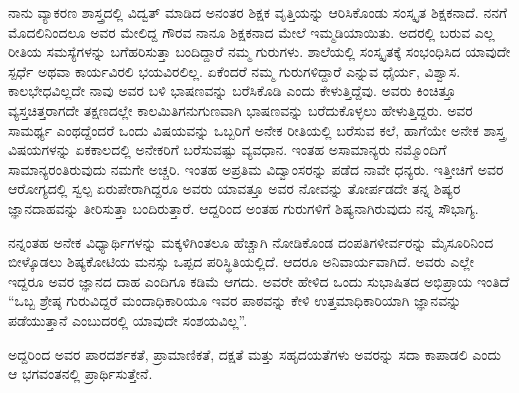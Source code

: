 {ನಾನು ವ್ಯಾಕರಣ ಶಾಸ್ತ್ರದಲ್ಲಿ ವಿದ್ವತ್ ಮಾಡಿದ ಅನಂತರ ಶಿಕ್ಷಕ ವೃತ್ತಿಯನ್ನು ಆರಿಸಿ\-ಕೊಂಡು ಸಂಸ್ಕೃತ ಶಿಕ್ಷಕನಾದೆ. ನನಗೆ ಮೊದಲಿನಿಂದಲೂ ಅವರ ಮೇಲಿದ್ದ ಗೌರವ ನಾನೂ ಶಿಕ್ಷಕನಾದ ಮೇಲೆ ಇಮ್ಮಡಿಯಾಯಿತು. ಅದರಲ್ಲಿ ಬರುವ ಎಲ್ಲ ರೀತಿಯ ಸಮಸ್ಯೆ\-ಗಳನ್ನು ಬಗೆಹರಿಸುತ್ತಾ ಬಂದಿದ್ದಾರೆ ನಮ್ಮ ಗುರುಗಳು. ಶಾಲೆಯಲ್ಲಿ ಸಂಸ್ಕೃತಕ್ಕೆ ಸಂಭಂಧಿಸಿದ ಯಾವುದೇ ಸ್ಪರ್ಧೆ ಅಥವಾ ಕಾರ್ಯವಿರಲಿ ಭಯವಿರಲಿಲ್ಲ. ಏಕೆಂದರೆ ನಮ್ಮ ಗುರುಗಳಿದ್ದಾರೆ ಎನ್ನುವ ಧೈರ್ಯ, ವಿಶ್ವಾಸ. ಕಾಲಭೇಧವಿಲ್ಲದೇ ನಾವು ಅವರ ಬಳಿ ಭಾಷಣವನ್ನು ಬರೆಸಿಕೊಡಿ ಎಂದು ಕೇಳುತ್ತಿದ್ದೆವು. ಅವರು ಕಿಂಚಿತ್ತೂ ವ್ಯಸ್ತಚಿತ್ತ\-ರಾಗದೇ ತಕ್ಷಣದಲ್ಲೇ ಕಾಲಮಿತಿಗನುಗುಣವಾಗಿ ಭಾಷಣವನ್ನು ಬರೆದುಕೊಳ್ಳಲು ಹೇಳುತ್ತಿದ್ದರು.  ಅವರ ಸಾಮರ್ಥ್ಯ ಎಂಥದ್ದೆಂದರೆ ಒಂದು ವಿಷಯವನ್ನು ಒಬ್ಬರಿಗೆ ಅನೇಕ ರೀತಿಯಲ್ಲಿ  ಬರೆಸುವ ಕಲೆ, ಹಾಗೆಯೇ ಅನೇಕ ಶಾಸ್ತ್ರ ವಿಷಯಗಳನ್ನು ಏಕಕಾಲದಲ್ಲಿ ಅನೇಕರಿಗೆ ಬರೆಸುವಷ್ಟು ವ್ಯವಧಾನ. ಇಂತಹ ಅಸಾಮಾನ್ಯರು ನಮ್ಮೊಂದಿಗೆ ಸಾಮಾನ್ಯರಂತಿರು\-ವುದು ನಮಗೇ ಅಚ್ಚರಿ. ಇಂತಹ ಅಪ್ರತಿಮ ವಿದ್ವಾಂಸರನ್ನು ಪಡೆದ ನಾವೇ ಧನ್ಯರು. ಇತ್ತೀಚಿಗೆ ಅವರ ಆರೋಗ್ಯದಲ್ಲಿ ಸ್ವಲ್ಪ ಏರುಪೇರಾಗಿದ್ದರೂ ಅವರು ಯಾವತ್ತೂ ಅವರ ನೋವನ್ನು ತೋರ್ಪಡದೇ ತನ್ನ ಶಿಷ್ಯರ ಜ್ಞಾನದಾಹವನ್ನು ತೀರಿಸುತ್ತಾ ಬಂದಿರುತ್ತಾರೆ. ಆದ್ದರಿಂದ ಅಂತಹ ಗುರುಗಳಿಗೆ ಶಿಷ್ಯನಾಗಿರುವುದು ನನ್ನ ಸೌಭಾಗ್ಯ.
	
ನನ್ನಂತಹ ಅನೇಕ ವಿಧ್ಯಾರ್ಥಿಗಳನ್ನು ಮಕ್ಕಳಿಗಿಂತಲೂ ಹೆಚ್ಚಾಗಿ ನೋಡಿಕೊಂಡ ದಂಪತಿಗಳೀರ್ವರನ್ನು ಮೈಸೂರಿನಿಂದ ಬೀಳ್ಕೊಡಲು ಶಿಷ್ಯಕೋಟಿಯ ಮನಸ್ಸು ಒಪ್ಪದ ಪರಿಸ್ಥಿತಿಯಲ್ಲಿದೆ. ಆದರೂ ಅನಿವಾರ್ಯವಾಗಿದೆ. ಅವರು ಎಲ್ಲೇ ಇದ್ದರೂ ಅವರ ಜ್ಞಾನದ ದಾಹ ಎಂದಿಗೂ ಕಡಿಮೆ ಆಗದು. ಅವರೇ ಹೇಳಿದ ಒಂದು ಸುಭಾಷಿತದ ಅಭಿಪ್ರಾಯ ಇಂತಿದೆ  \enginline{--}\\
 “ಒಬ್ಬ ಶ್ರೇಷ್ಠ ಗುರುವಿದ್ದರೆ ಮಂದಾಧಿಕಾರಿಯೂ ಇವರ ಪಾಠವನ್ನು ಕೇಳಿ ಉತ್ತಮಾಧಿಕಾರಿಯಾಗಿ ಜ್ಞಾನವನ್ನು ಪಡೆಯುತ್ತಾನೆ ಎಂಬುದರಲ್ಲಿ ಯಾವುದೇ ಸಂಶಯವಿಲ್ಲ”.

ಅದ್ದರಿಂದ ಅವರ ಪಾರದರ್ಶಕತೆ, ಪ್ರಾಮಾಣಿಕತೆ, ದಕ್ಷತೆ ಮತ್ತು ಸಹೃದಯತೆಗಳು ಅವರನ್ನು ಸದಾ ಕಾಪಾಡಲಿ ಎಂದು ಆ ಭಗವಂತನಲ್ಲಿ ಪ್ರಾರ್ಥಿಸುತ್ತೇನೆ.

\articleend
}
